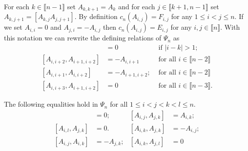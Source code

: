 \documentclass[11pt,fleqn]{amsart}
\newcommand\interval[1]{\llbracket #1 \rrbracket}
\begin{document}
For each $k \in \interval{n-1}$ set $A_{k,k+1} = A_k$ and for each $j \in
\interval{k+1,n-1}$ set $A_{k,j+1} = [A_{k,j} A_{j,j+1}]$. By definition 
$c_n(A_{i,j}) = F_{i,j}$ for any $1 \leq i < j \leq n$. If we set $A_{i,i} = 0$
and $A_{j,i} = - A_{i,j}$ then $c_n(A_{i,j}) = E_{i,j}$ for any $i,j \in 
\interval n$. With this notation we can rewrite the defining relations of
$\Psi_n$ as
\begin{align}
[A_{i,i+1}, A_{k,k+1}]
	&= 0 & \mbox{ if } |i-k| > 1; \\
[A_{i,i+2}, A_{i+1,i+2}] 
	&= - A_{i,i+1} & \mbox{ for all } i \in \interval{n-2} \\
	[A_{i,i+1}, A_{i,i+2}] 
	&= - A_{i+1,i+2}; & \mbox{ for all } i \in \interval{n-2}  \\
[A_{i,i+3}, A_{i+1,i+2}] 
	&= 0 & \mbox{ for all } i \in \interval{n-3}.
\end{align}
\begin{Lemma*}
The following equalities hold in $\Psi_n$ for all $1 \leq i < j < k < l \leq 
n$.
\begin{align*}
[A_{i,j}, A_{k,l}]
	&= 0; 
&[A_{i,j}, A_{j,k}]
	&= A_{i,k}; \\
[A_{i,l}, A_{j,k}] 
	&= 0.
&[A_{i,k}, A_{j,k}] 
	&= - A_{i,j}; \\
[A_{i,j}, A_{i,k}] 
	&= - A_{j,k}; 
&[A_{i,k}, A_{j,l}] 
	&=0
\end{align*}
\end{Lemma*}
\end{document}
